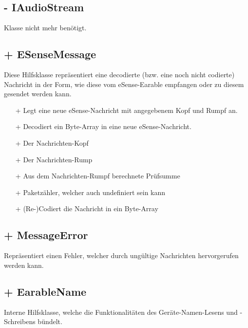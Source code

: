 \documentclass[../implementierung.tex]{subfiles}
\begin{document}
		\subsection{- IAudioStream}
			Klasse nicht mehr benötigt.

		\subsection{+ ESenseMessage}
			Diese Hilfsklasse repräsentiert eine decodierte (bzw. eine noch nicht codierte) Nachricht in der Form,
			wie diese vom eSense-Earable empfangen oder zu diesem gesendet werden kann.
			\begin{itemize}
				\item[+]{ Legt eine neue eSense-Nachricht mit angegebenem Kopf und Rumpf an.}
				\item[+]{ Decodiert ein Byte-Array in eine neue eSense-Nachricht.}
				\item[+]{ Der Nachrichten-Kopf}
				\item[+]{ Der Nachrichten-Rump}
				\item[+]{ Aus dem Nachrichten-Rumpf berechnete Prüfsumme}
				\item[+]{ Paketzähler, welcher auch undefiniert sein kann}
				\item[+]{ (Re-)Codiert die Nachricht in ein Byte-Array}
			\end{itemize}

		\subsection{+ MessageError}
			Repräsentiert einen Fehler, welcher durch ungültige Nachrichten hervorgerufen werden kann.

		\subsection{+ EarableName}
			Interne Hilfsklasse, welche die Funktionalitäten des Geräte-Namen-Lesens und -Schreibens bündelt.
\end{document}
